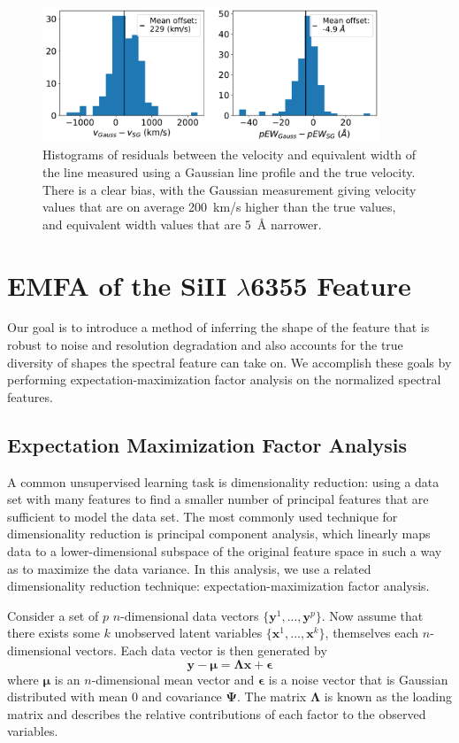 \begin{figure}[htbp]
    \centering
    \includegraphics[width=0.9\textwidth]{figures/si_feat_pca/gauss_bias.pdf}
    \caption{Histograms of residuals between the velocity and equivalent width of the \siliconii{} line measured using a Gaussian line profile and the true velocity. There is a clear bias, with the Gaussian measurement giving velocity values that are on average 200~km/s higher than the true values, and equivalent width values that are 5~\AA{} narrower.}
    \label{gauss_bias}
\end{figure}


\section{EMFA of the SiII \texorpdfstring{$\lambda$}{}6355 Feature}
\label{method}
Our goal is to introduce a method of inferring the shape of the \siliconii{} feature that is robust to noise and resolution degradation and also accounts for the true diversity of shapes the spectral feature can take on. We accomplish these goals by performing expectation-maximization factor analysis on the normalized spectral features.

\subsection{Expectation Maximization Factor Analysis}
A common unsupervised learning task is dimensionality reduction: using a data set with many features to find a smaller number of principal features that are sufficient to model the data set. The most commonly used technique for dimensionality reduction is principal component analysis, which linearly maps data to a lower-dimensional subspace of the original feature space in such a way as to maximize the data variance. In this analysis, we use a related dimensionality reduction technique: expectation-maximization factor analysis.

Consider a set of $p$ $n$-dimensional data vectors $\{\bm{y}^1, ..., \bm{y}^p\}$. Now assume that there exists some $k$ unobserved latent variables $\{\bm{x}^1, ..., \bm{x}^k\}$, themselves each $n$-dimensional vectors. Each data vector is then generated by
\begin{equation}
\bm{y} - \bm{\mu} = \bm{\Lambda}\bm{x}+\bm{\epsilon}
\end{equation}
where $\bm{\mu}$ is an $n$-dimensional mean vector and $\bm{\epsilon}$ is a noise vector that is Gaussian distributed with mean 0 and covariance $\bm{\Psi}$. The matrix $\bm{\Lambda}$ is known as the loading matrix and describes the relative contributions of each factor to the observed variables.

